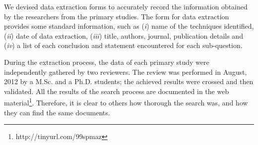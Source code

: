 












We devised data extraction forms to accurately record the information obtained by the researchers from the primary studies. The form for data extraction provides some standard information, such as (\textit{i}) name of the techniques identified, (\textit{ii}) date of data extraction, (\textit{iii}) title, authors, journal, publication details and (\textit{iv}) a list of each conclusion and statement encountered for each sub-question. 

During the extraction process, the data of each primary study were independently gathered by two reviewers. The review was performed in August, 2012 by a M.Sc. and a Ph.D. students; the achieved results were crossed and then validated. All the results of the search process are documented in the web material\footnote{http://tinyurl.com/99spmaz}. Therefore, it is clear to others how thorough the search was, and how they can find the same documents.
